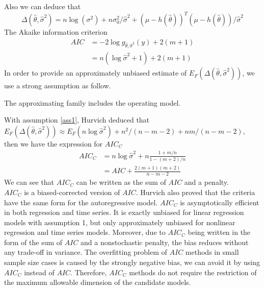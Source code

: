 Also we can deduce that 
\begin{equation}\label{KL-es}
    \Delta (\hat\theta, \hat\sigma^2) = n\log(\sigma^2)+ n\sigma_0^2/\hat\sigma^2 + (\mu -h(\hat\theta))^T(\mu -h(\hat\theta))/\hat\sigma^2
\end{equation}
The Akaike information criterion
\begin{equation}\label{aic}
\begin{split}
    AIC &= -2\log g_{\hat{\theta}, \hat{\sigma}^2}(y) + 2(m+1)\\
    &= n(\log \hat{\sigma}^2+1)+2(m+1)
\end{split}
\end{equation}
In order to provide an approximately unbiased estimate of $E_F(\Delta (\hat{\theta}, \hat{\sigma}^2))$, we use a strong assumption as follow.
\begin{assumption}\label{ass1}
    The approximating family includes the operating model.
\end{assumption}

With assumption \ref{ass1}, Hurvich deduced that $
    E_F(\Delta (\hat{\theta}, \hat{\sigma}^2)) \approx E_F(n\log \hat\sigma^2)+n^2/(n-m-2)+nm/(n-m-2)$, then we have the expression for $AIC_C$
\begin{equation}\label{aic_c}
    \begin{split}
        AIC_C &= n\log \hat\sigma^2 +n\frac{1+m/n}{1-(m+2)/n}\\
            &= AIC + \frac{2(m+1)(m+2)}{n-m-2}
    \end{split}
\end{equation}
We can see that $AIC_C$ can be written as the sum of $AIC$ and a penalty.\\

$AIC_C$ is a biased-corrected version of $AIC$. Hurvich also proved that the criteria have the same form for the autoregressive model.
$AIC_C$ is asymptotically efficient in both regression and time series. It is exactly unbiased for linear regression models with assumption 1, but only approximately unbiased for nonlinear regression and time series models. Moreover, due to $AIC_C$ being written in the form of the sum of $AIC$ and a nonstochastic penalty, the bias reduces without any trade-off in variance. The overfitting problem of $AIC$ methods in small sample size cases is caused by the strongly negative bias, we can avoid it by using $AIC_C$ instead of $AIC$. Therefore, $AIC_C$ methods do not require the restriction of the maximum allowable dimension of the candidate models. 
